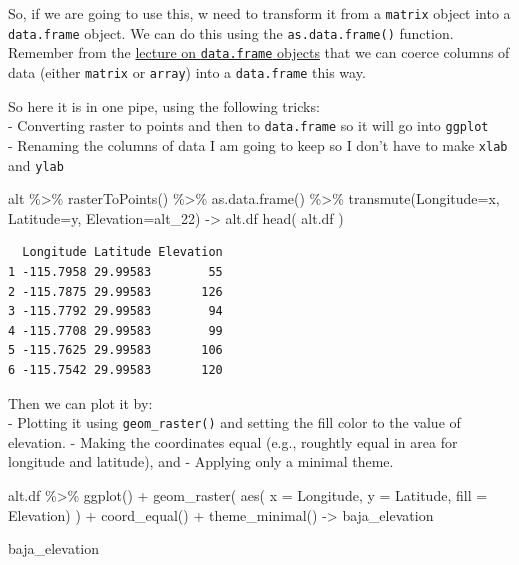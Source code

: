 \documentclass[
  letterpaper,
]{book}
\newenvironment{Shaded}{\begin{snugshade}}{\end{snugshade}}
\newcommand{\AttributeTok}[1]{\textcolor[rgb]{0.40,0.45,0.13}{#1}}
\newcommand{\FunctionTok}[1]{\textcolor[rgb]{0.28,0.35,0.67}{#1}}
\newcommand{\NormalTok}[1]{\textcolor[rgb]{0.00,0.23,0.31}{#1}}
\newcommand{\OtherTok}[1]{\textcolor[rgb]{0.00,0.23,0.31}{#1}}
\newcommand{\SpecialCharTok}[1]{\textcolor[rgb]{0.37,0.37,0.37}{#1}}
\begin{document}
So, if we are going to use this, w need to transform it from a
\texttt{matrix} object into a \texttt{data.frame} object. We can do this
using the \texttt{as.data.frame()} function. Remember from the
\href{https://dyerlab.github.io/ENVS-Lectures/r_language/data_frames/slides.html\#1}{lecture
on \texttt{data.frame} objects} that we can coerce columns of data
(either \texttt{matrix} or \texttt{array}) into a \texttt{data.frame}
this way.

So here it is in one pipe, using the following tricks:\\
- Converting raster to points and then to \texttt{data.frame} so it will
go into \texttt{ggplot}\\
- Renaming the columns of data I am going to keep so I don't have to
make \texttt{xlab} and \texttt{ylab}

\begin{Shaded}
\begin{Highlighting}[]
\NormalTok{alt }\SpecialCharTok{\%\textgreater{}\%}
  \FunctionTok{rasterToPoints}\NormalTok{() }\SpecialCharTok{\%\textgreater{}\%}
  \FunctionTok{as.data.frame}\NormalTok{() }\SpecialCharTok{\%\textgreater{}\%} 
  \FunctionTok{transmute}\NormalTok{(}\AttributeTok{Longitude=}\NormalTok{x,}
            \AttributeTok{Latitude=}\NormalTok{y,}
            \AttributeTok{Elevation=}\NormalTok{alt\_22)  }\OtherTok{{-}\textgreater{}}\NormalTok{ alt.df}
\FunctionTok{head}\NormalTok{( alt.df )}
\end{Highlighting}
\end{Shaded}

\begin{verbatim}
  Longitude Latitude Elevation
1 -115.7958 29.99583        55
2 -115.7875 29.99583       126
3 -115.7792 29.99583        94
4 -115.7708 29.99583        99
5 -115.7625 29.99583       106
6 -115.7542 29.99583       120
\end{verbatim}

Then we can plot it by:\\
- Plotting it using \texttt{geom\_raster()} and setting the fill color
to the value of elevation. - Making the coordinates equal (e.g.,
roughtly equal in area for longitude and latitude), and - Applying only
a minimal theme.

\begin{Shaded}
\begin{Highlighting}[]
\NormalTok{alt.df }\SpecialCharTok{\%\textgreater{}\%}
  \FunctionTok{ggplot}\NormalTok{()  }\SpecialCharTok{+} 
  \FunctionTok{geom\_raster}\NormalTok{( }\FunctionTok{aes}\NormalTok{( }\AttributeTok{x =}\NormalTok{ Longitude, }
                    \AttributeTok{y =}\NormalTok{ Latitude, }
                    \AttributeTok{fill =}\NormalTok{ Elevation) ) }\SpecialCharTok{+} 
  \FunctionTok{coord\_equal}\NormalTok{() }\SpecialCharTok{+}
  \FunctionTok{theme\_minimal}\NormalTok{() }\OtherTok{{-}\textgreater{}}\NormalTok{ baja\_elevation}

\NormalTok{baja\_elevation}
\end{Highlighting}
\end{Shaded}
\end{document}
